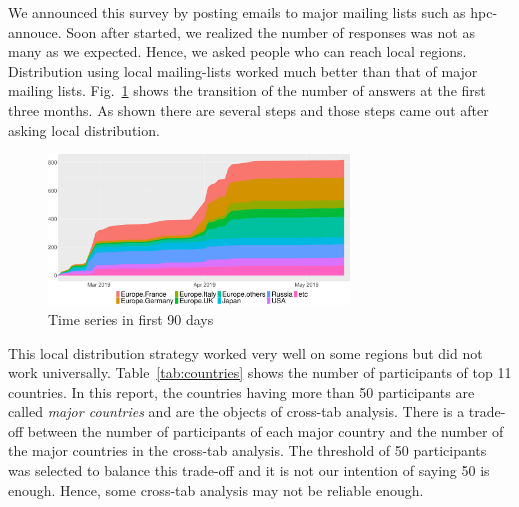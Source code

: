 \documentclass[conference,10pt,letterpaper]{IEEEtran}
\begin{document}
%
%
We announced this survey by posting emails to major mailing lists such
as hpc-annouce. Soon after started, we realized the number of
responses was not as many as we expected. Hence, we asked people who can
reach local regions. Distribution using local mailing-lists worked
much better than that of major mailing
lists. Fig.~\ref{fig:time-series} shows the transition of the number
of answers at the first three months. As shown there are several steps
and those steps came out after asking local distribution. 

\begin{figure}[htb]
  \begin{center}
    \includegraphics[width=8cm]{R-scripts/TimeSeries.pdf}
    \caption{Time series in first 90 days}
    \label{fig:time-series}
  \end{center}
\end{figure}

This local distribution strategy worked very well on some regions but
did not work universally. Table~\ref{tab:countries} shows the number
of participants of top 11 countries. In this report, the
countries having more than 50 participants are called {\it major
  countries} and are the objects of cross-tab analysis. There is a
trade-off between the number of participants of each major country
and the number of the major countries in the cross-tab analysis. The
threshold of 50 participants was selected to balance this trade-off
and it is not our intention of saying 50 is enough. Hence, some cross-tab
analysis may not be reliable enough.
\end{document}
